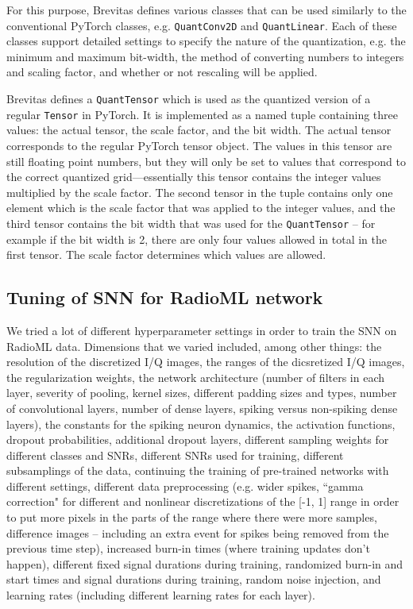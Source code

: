 \documentclass[parskip=true, 10pt]{scrartcl}
\begin{document}
For this purpose, Brevitas defines various classes that can be used similarly to the conventional PyTorch classes, e.g. \texttt{QuantConv2D} and \texttt{QuantLinear}. Each of these classes support detailed settings to specify the nature of the quantization, e.g. the minimum and maximum bit-width, the method of converting numbers to integers and scaling factor, and whether or not rescaling will be applied.

Brevitas defines a \texttt{QuantTensor} which is used as the quantized version of a regular \texttt{Tensor} in PyTorch. It is implemented as a named tuple containing three values: the actual tensor, the scale factor, and the bit width. The actual tensor corresponds to the regular PyTorch tensor object. The values in this tensor are still floating point numbers, but they will only be set to values that correspond to the correct quantized grid---essentially this tensor contains the integer values multiplied by the scale factor. 
The second tensor in the tuple contains only one element which is the scale factor that was applied to the integer values, and the third tensor contains the bit width that was used for the \texttt{QuantTensor} -- for example if
the bit width is 2, there are only four values allowed in total in the first tensor. The scale factor determines which values are allowed.

\subsection{Tuning of SNN for RadioML network}

We tried a lot of different hyperparameter settings in order to train the SNN on RadioML data. Dimensions that we varied included, among other things: the resolution of the discretized I/Q images, the ranges of the dicsretized I/Q images, the regularization weights, the network architecture (number of filters in each layer, severity of pooling, kernel sizes, different padding sizes and types, number of convolutional layers, number of dense layers, spiking versus non-spiking dense layers), the constants for the spiking neuron dynamics, the activation functions, dropout probabilities, additional dropout layers, different sampling weights for different classes and SNRs, different SNRs used for training, different subsamplings of the data, continuing the training of pre-trained networks with different settings, different data preprocessing (e.g. wider spikes, ``gamma correction" for different and nonlinear discretizations of the [-1, 1] range in order to put more pixels in the parts of the range where there were more samples, difference images -- including an extra event for spikes being removed from the previous time step), increased burn-in times (where training updates don't happen), different fixed signal durations during training, randomized burn-in and start times and signal durations during training, random noise injection, and learning rates (including different learning rates for each layer). 
\end{document}
